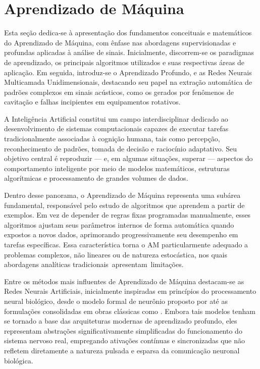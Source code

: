 \section{Aprendizado de Máquina}

Esta seção dedica-se à apresentação dos fundamentos conceituais e matemáticos do Aprendizado de Máquina, com ênfase nas abordagens supervisionadas e profundas aplicadas à análise de sinais. Inicialmente, discorrem-se os paradigmas de aprendizado, os principais algoritmos utilizados e suas respectivas áreas de aplicação. Em seguida, introduz-se o Aprendizado Profundo, e as Redes Neurais Multicamada Unidimensionais, destacando seu papel na extração automática de padrões complexos em sinais acústicos, como os gerados por fenômenos de cavitação e falhas incipientes em equipamentos rotativos.

A Inteligência Artificial constitui um campo interdisciplinar dedicado ao desenvolvimento de sistemas computacionais capazes de executar tarefas tradicionalmente associadas à cognição humana, tais como percepção, reconhecimento de padrões, tomada de decisão e raciocínio adaptativo. Seu objetivo central é reproduzir — e, em algumas situações, superar — aspectos do comportamento inteligente por meio de modelos matemáticos, estruturas algorítmicas e processamento de grandes volumes de dados.

Dentro desse panorama, o Aprendizado de Máquina representa uma subárea fundamental, responsável pelo estudo de algoritmos que aprendem a partir de exemplos. Em vez de depender de regras fixas programadas manualmente, esses algoritmos ajustam seus parâmetros internos de forma automática quando expostos a novos dados, aprimorando progressivamente seu desempenho em tarefas específicas. Essa característica torna o AM particularmente adequado a problemas complexos, não lineares ou de natureza estocástica, nos quais abordagens analíticas \mbox{tradicionais apresentam limitações.}

Entre os métodos mais influentes de Aprendizado de Máquina destacam-se as Redes Neurais Artificiais, inicialmente inspiradas em princípios do processamento neural biológico, desde o modelo formal de neurônio proposto por  até as formulações consolidadas em obras clássicas como . Embora tais modelos tenham se tornado a base das arquiteturas modernas de aprendizado profundo, eles representam abstrações significativamente simplificadas do funcionamento do sistema nervoso real, empregando ativações contínuas e sincronizadas que não refletem diretamente a natureza pulsada e esparsa da comunicação neuronal biológica.

